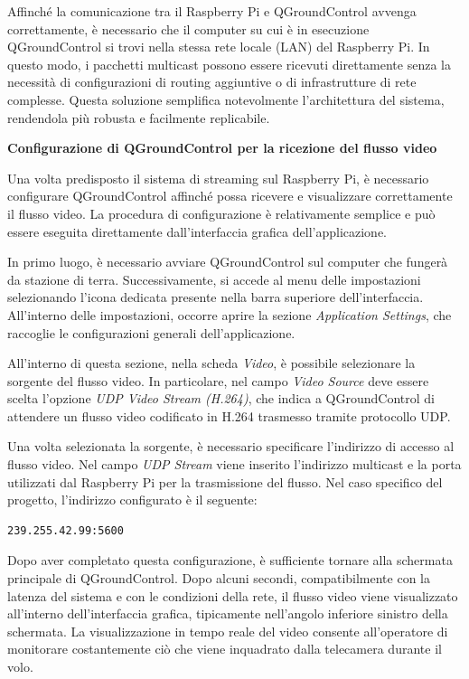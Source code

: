 Affinché la comunicazione tra il Raspberry Pi e QGroundControl avvenga correttamente, è necessario che il computer su cui è in esecuzione QGroundControl si trovi nella stessa rete locale (LAN) del Raspberry Pi.
In questo modo, i pacchetti multicast possono essere ricevuti direttamente senza la necessità di configurazioni di routing aggiuntive o di infrastrutture di rete complesse.
Questa soluzione semplifica notevolmente l’architettura del sistema, rendendola più robusta e facilmente replicabile.

\bigskip
\noindent \textbf{Configurazione di QGroundControl per la ricezione del flusso video}
\bigskip

Una volta predisposto il sistema di streaming sul Raspberry Pi, è necessario configurare QGroundControl affinché possa ricevere e visualizzare correttamente il flusso video.
La procedura di configurazione è relativamente semplice e può essere eseguita direttamente dall’interfaccia grafica dell’applicazione.

In primo luogo, è necessario avviare QGroundControl sul computer che fungerà da stazione di terra.
Successivamente, si accede al menu delle impostazioni selezionando l’icona dedicata presente nella barra superiore dell’interfaccia.
All’interno delle impostazioni, occorre aprire la sezione \textit{Application Settings}, che raccoglie le configurazioni generali dell’applicazione.

All’interno di questa sezione, nella scheda \textit{Video}, è possibile selezionare la sorgente del flusso video.
In particolare, nel campo \textit{Video Source} deve essere scelta l’opzione \textit{UDP Video Stream (H.264)}, che indica a QGroundControl di attendere un flusso video codificato in H.264 trasmesso tramite protocollo UDP.

Una volta selezionata la sorgente, è necessario specificare l’indirizzo di accesso al flusso video.
Nel campo \textit{UDP Stream} viene inserito l’indirizzo multicast e la porta utilizzati dal Raspberry Pi per la trasmissione del flusso.
Nel caso specifico del progetto, l’indirizzo configurato è il seguente:

\begin{verbatim}
239.255.42.99:5600
\end{verbatim}

Dopo aver completato questa configurazione, è sufficiente tornare alla schermata principale di QGroundControl.
Dopo alcuni secondi, compatibilmente con la latenza del sistema e con le condizioni della rete, il flusso video viene visualizzato all’interno dell’interfaccia grafica, tipicamente nell’angolo inferiore sinistro della schermata.
La visualizzazione in tempo reale del video consente all’operatore di monitorare costantemente ciò che viene inquadrato dalla telecamera durante il volo.

